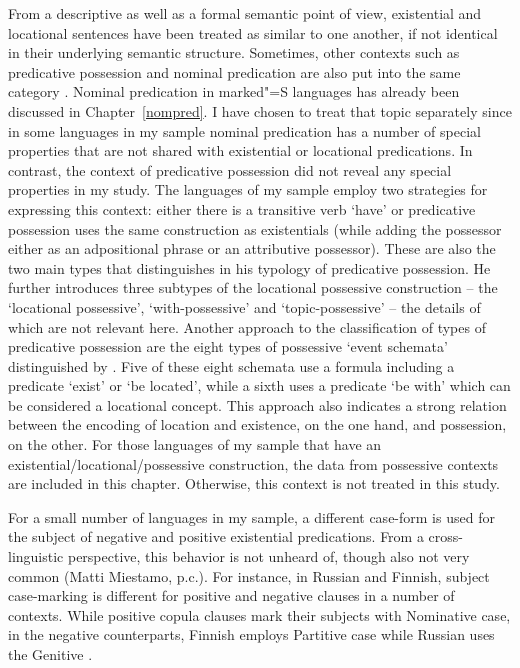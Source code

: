 From a descriptive as well as a formal semantic point of view, existential and locational sentences have been treated as similar to one another, if not identical in their underlying semantic structure.
Sometimes, other contexts such as predicative possession and nominal predication are also put into the same category \citep[111--113]{Payne:1997}.
Nominal predication in marked"=S languages has already been discussed in Chapter~\ref{nompred}. 
I have chosen to treat that topic separately since in some languages in my sample nominal predication has a number of special properties that are not shared with existential or locational predications. 
In contrast, the context of predicative possession did not reveal any special properties in my study.
The languages of my sample employ two strategies for expressing this context: either there is a transitive verb `have' or predicative possession uses the same construction as existentials (while adding the possessor either as an adpositional phrase or an attributive possessor). 
These are also the two main types that \citet{Stassen:2009} distinguishes in his typology of predicative possession. 
He further introduces three subtypes of the locational possessive construction -- the `locational possessive', `with-possessive' and `topic-possessive' -- the details of which are not relevant here.
Another approach to the classification of types of predicative possession are the eight types of possessive `event schemata' distinguished by \citet[47]{Heine:1997}. 
Five of these eight schemata use a formula including a predicate `exist' or `be located', while a sixth uses a predicate `be with' which can be considered a locational concept. 
This approach also indicates a strong relation between the encoding of location and existence, on the one hand, and possession, on the other.
For those languages of my sample that have an existential/locational/possessive construction, the data from possessive contexts are included in this chapter.
Otherwise, this context is not treated in this study.

For a small number of languages in my sample, a different case-form is used for the subject of negative and positive existential predications.
From a cross-linguistic perspective, this behavior is not unheard of, though also not very common (Matti Miestamo, p.c.).
For instance, in Russian and Finnish, subject case-marking is different for positive and negative clauses in a number of contexts. 
While positive copula clauses mark their subjects with Nominative case, in the negative counterparts, Finnish employs Partitive case while Russian uses the Genitive \citep[167]{Dixon:2010-2}.   


